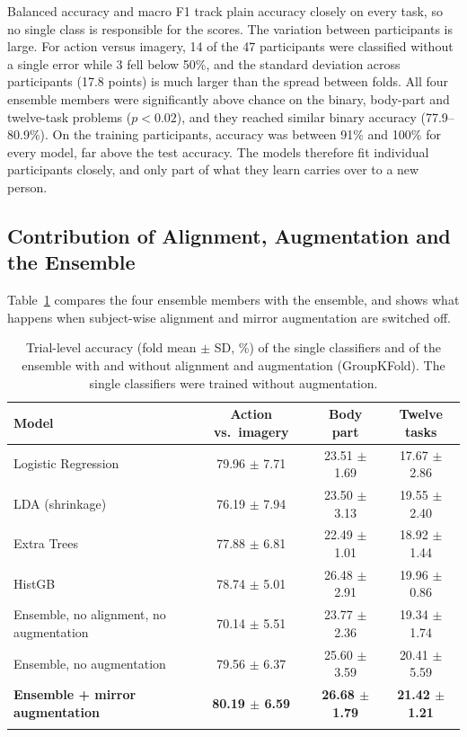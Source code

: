 \documentclass[pdflatex,sn-mathphys-num]{sn-jnl}%
\theoremstyle{thmstyleone}%
\theoremstyle{thmstyletwo}%
\theoremstyle{thmstylethree}%
\begin{document}
Balanced accuracy and macro F1 track plain accuracy closely on every task, so no single class is responsible for the scores. The variation between participants is large. For action versus imagery, 14 of the 47 participants were classified without a single error while 3 fell below 50\%, and the standard deviation across participants (17.8 points) is much larger than the spread between folds. All four ensemble members were significantly above chance on the binary, body-part and twelve-task problems ($p < 0.02$), and they reached similar binary accuracy (77.9--80.9\%). On the training participants, accuracy was between 91\% and 100\% for every model, far above the test accuracy. The models therefore fit individual participants closely, and only part of what they learn carries over to a new person.

\subsection{Contribution of Alignment, Augmentation and the Ensemble}\label{subsec:ablation}

Table~\ref{tab:ablation} compares the four ensemble members with the ensemble, and shows what happens when subject-wise alignment and mirror augmentation are switched off.

\begin{table}[htbp]
\centering
\caption{Trial-level accuracy (fold mean $\pm$ SD, \%) of the single classifiers and of the ensemble with and without alignment and augmentation (GroupKFold). The single classifiers were trained without augmentation.}
\label{tab:ablation}
\footnotesize
\begin{tabular}{@{}lccc@{}}
\toprule
\textbf{Model} & \textbf{Action vs.\ imagery} & \textbf{Body part} & \textbf{Twelve tasks} \\
\midrule
Logistic Regression & 79.96 $\pm$ 7.71 & 23.51 $\pm$ 1.69 & 17.67 $\pm$ 2.86 \\
LDA (shrinkage) & 76.19 $\pm$ 7.94 & 23.50 $\pm$ 3.13 & 19.55 $\pm$ 2.40 \\
Extra Trees & 77.88 $\pm$ 6.81 & 22.49 $\pm$ 1.01 & 18.92 $\pm$ 1.44 \\
HistGB & 78.74 $\pm$ 5.01 & 26.48 $\pm$ 2.91 & 19.96 $\pm$ 0.86 \\
Ensemble, no alignment, no augmentation & 70.14 $\pm$ 5.51 & 23.77 $\pm$ 2.36 & 19.34 $\pm$ 1.74 \\
Ensemble, no augmentation & 79.56 $\pm$ 6.37 & 25.60 $\pm$ 3.59 & 20.41 $\pm$ 5.59 \\
\textbf{Ensemble + mirror augmentation} & \textbf{80.19 $\pm$ 6.59} & \textbf{26.68 $\pm$ 1.79} & \textbf{21.42 $\pm$ 1.21} \\
\botrule
\end{tabular}
\end{table}
\end{document}
